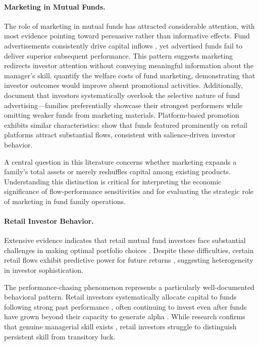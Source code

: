 \documentclass[12pt]{article}
\begin{document}
\paragraph{Marketing in Mutual Funds.} The role of marketing in mutual funds has attracted considerable attention, with most evidence pointing toward persuasive rather than informative effects. Fund advertisements consistently drive capital inflows \citep{jain2000truth}, yet advertised funds fail to deliver superior subsequent performance. This pattern suggests marketing redirects investor attention without conveying meaningful information about the manager's skill. \citet{roussanov2021marketing} quantify the welfare costs of fund marketing, demonstrating that investor outcomes would improve absent promotional activities. Additionally, \citet{koehler2009selection} document that investors systematically overlook the selective nature of fund advertising—families preferentially showcase their strongest performers while omitting weaker funds from marketing materials. Platform-based promotion exhibits similar characteristics: \citet{hong2025fintech} show that funds featured prominently on retail platforms attract substantial flows, consistent with salience-driven investor behavior. %

A central question in this literature concerns whether marketing expands a family's total assets or merely reshuffles capital among existing products. Understanding this distinction is critical for interpreting the economic significance of flow-performance sensitivities \citep{sirri1998costly, jain2000truth, kaniel2017trading} and for evaluating the strategic role of marketing in fund family operations.

\paragraph{Retail Investor Behavior.} Extensive evidence indicates that retail mutual fund investors face substantial challenges in making optimal portfolio choices \citep{bailey2011behavioral, barber2016attention, choi2020attention, bendavid2022attention}. Despite these difficulties, certain retail flows exhibit predictive power for future returns \citep{lou2012flow}, suggesting heterogeneity in investor sophistication.

The performance-chasing phenomenon represents a particularly well-documented behavioral pattern. Retail investors systematically allocate capital to funds following strong past performance \citep{frazzini2008dumb}, often continuing to invest even after funds have grown beyond their capacity to generate alpha \citep{song2020mismatch}. While research confirms that genuine managerial skill exists \citep{grinblatt1989mutual, berk2015measuring}, retail investors struggle to distinguish persistent skill from transitory luck.
\end{document}
